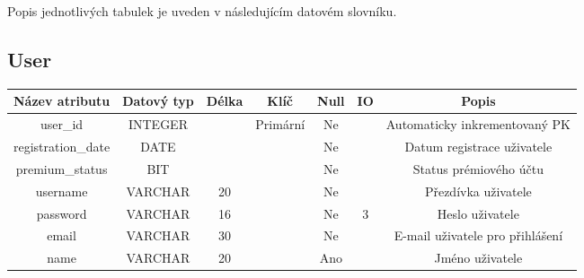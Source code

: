 Popis jednotlivých tabulek je uveden v následujícím datovém slovníku.

\subsection*{User}
\begin{tabular}{ |c|c c c c c|c| }
    \hline
    \textbf{Název atributu} & \textbf{Datový typ} & \textbf{Délka} & \textbf{Klíč} & \textbf{Null} & \textbf{IO} & \textbf{Popis}                         \\
    \hline
    user\_id                & INTEGER             &                & Primární      & Ne            &             & Automaticky inkrementovaný PK   \\
    registration\_date      & DATE                &                &               & Ne            &             & Datum registrace uživatele      \\
    premium\_status         & BIT                 &                &               & Ne            &             & Status prémiového účtu          \\
    username                & VARCHAR             & 20             &               & Ne            &             & Přezdívka uživatele             \\
    password                & VARCHAR             & 16             &               & Ne            & 3           & Heslo uživatele                 \\
    email                   & VARCHAR             & 30             &               & Ne            &             & E-mail uživatele pro přihlášení \\
    name                    & VARCHAR             & 20             &               & Ano           &             & Jméno uživatele                 \\
    \hline
\end{tabular}
\bigskip

